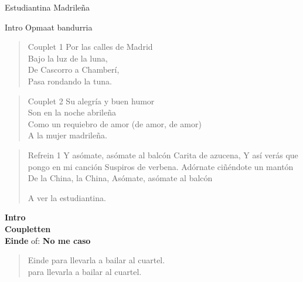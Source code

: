 \begin{song}{Estudiantina Madrileña}

\begin{instrumental}{Intro}
Opmaat bandurria
 \measure{} \measure{}  \measure{} \measure{} \measure{} 
\measure{}  \measure{}  \measure{}   
  \measure*{}
\end{instrumental}

\begin{verse}{Couplet 1}
\hspace{2em} Por las calles de Madrid \\
\hspace{2em} Bajo la luz de la luna,\\
De Cascorro a Chamberí,\\
Pasa rondando la tuna.\\
\end{verse}

\begin{verse}{Couplet 2}
Su alegría y buen humor\\
Son en la noche abrileña\\
Como un requiebro de amor (de amor, de amor)\\
A la mujer madrileña.\\
\end{verse}

\begin{verse}{Refrein 1}
Y asómate, asómate al balcón
Carita de azucena,
Y así verás que pongo en mi canción
Suspiros de verbena.
Adórnate ciñéndote un mantón
De la China, la China,
Asómate, asómate al balcón

A ver la estudiantina.
\end{verse}

\textbf {Intro} \\
\textbf {Coupletten}\\
\vspace{1.25ex}
\textbf{Einde} of: \textbf{ No me caso}\\
\begin{verse}{Einde}
para llevarla a bailar al cuartel.\\
para llevarla a bailar al cuartel.\\
\end{verse}
\end{song}
